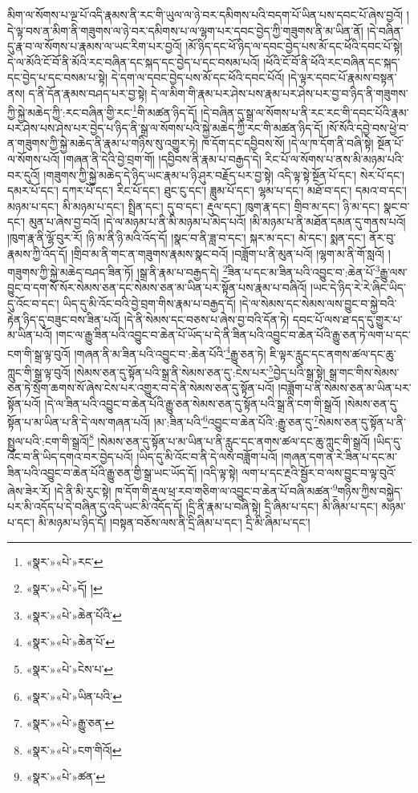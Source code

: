 མིག་ལ་སོགས་པ་ལྔ་པོ་འདི་རྣམས་ནི་རང་གི་ཡུལ་ལ་ཉེ་བར་དམིགས་པའི་བདག་པོ་ཡིན་པས་དབང་པོ་ཞེས་བྱའོ། །དེ་ལྟ་བས་ན་མིག་ནི་གཟུགས་ལ་ཉེ་བར་དམིགས་པ་ལ་ལྷག་པར་དབང་བྱེད་ཀྱི་གཟུགས་ནི་མ་ཡིན་ནོ། །དེ་བཞིན་དུ་རྣ་བ་ལ་སོགས་པ་རྣམས་ལ་ཡང་རིག་པར་བྱའོ། །མོ་ཉིད་དང་ཕོ་ཉིད་ལ་དབང་བྱེད་པས་མོ་དང་ཕོའི་དབང་པོ་སྟེ། དེ་ལ་མོའི་ངོ་བོ་ནི་མོའི་རང་བཞིན་དང་སྐད་དང་བྱེད་པ་དང་བསམ་པའོ། །ཕོའི་ངོ་བོ་ནི་ཕོའི་རང་བཞིན་དང་སྐད་དང་བྱེད་པ་དང་བསམ་པ་སྟེ། དེ་དག་ལ་དབང་བྱེད་པས་མོ་དང་ཕོའི་དབང་པོའོ། །དེ་ལྟར་དབང་པོ་རྣམས་བསྟན་ནས། ད་ནི་དོན་རྣམས་བཤད་པར་བྱ་སྟེ། དེ་ལ་མིག་གི་རྣམ་པར་ཤེས་པས་རྣམ་པར་ཤེས་པར་བྱ་བ་ཉིད་ནི་གཟུགས་ཀྱི་སྐྱེ་མཆེད་ཀྱི་:རང་བཞིན་གྱི་རང་\footnote{«སྣར་»«པེ་»རང་}གི་མཚན་ཉིད་དོ། །དེ་བཞིན་དུ་སྒྲ་ལ་སོགས་པ་ནི་རང་རང་གི་དབང་པོའི་རྣམ་པར་ཤེས་པས་ཤེས་པར་བྱེད་པ་ཉིད་ནི་སྒྲ་ལ་སོགས་པའི་སྐྱེ་མཆེད་ཀྱི་རང་གི་མཚན་ཉིད་དོ། །སོ་སོའི་དབྱེ་བས་ཕྱེ་བ་ན་གཟུགས་ཀྱི་སྐྱེ་མཆེད་ནི་རྣམ་པ་གཉིས་སུ་འགྱུར་ཏེ། ཁ་དོག་དང་དབྱིབས་སོ། །དེ་ལ་ཁ་དོག་ནི་བཞི་སྟེ། སྔོན་པོ་ལ་སོགས་པའོ། །གཞན་ནི་དེའི་བྱེ་བྲག་གོ། །དབྱིབས་ནི་རྣམ་པ་བརྒྱད་དེ། རིང་པོ་ལ་སོགས་པ་ནས་མི་མཉམ་པའི་བར་དུའོ། །གཟུགས་ཀྱི་སྐྱེ་མཆེད་དེ་ཉིད་ཡང་རྣམ་པ་ཉི་ཤུར་བརྗོད་པར་བྱ་སྟེ། འདི་ལྟ་སྟེ་སྔོན་པོ་དང་། སེར་པོ་དང་། དམར་པོ་དང་། དཀར་པོ་དང་། རིང་པོ་དང་། ཐུང་ངུ་དང་། ཟླུམ་པོ་དང་། ལྷམ་པ་དང་། མཐོ་བ་དང་། དམའ་བ་དང་། མཉམ་པ་དང་། མི་མཉམ་པ་དང་། སྤྲིན་དང་། དུ་བ་དང་། རྡུལ་དང་། ཁུག་རྣ་དང་། གྲིབ་མ་དང་། ཉི་མ་དང་། སྣང་བ་དང་། མུན་པ་ཞེས་བྱ་བའོ། །དེ་ལ་མཉམ་པ་ནི་མི་མཉམ་པ་མེད་པའོ། །མི་མཉམ་པ་ནི་མཐོན་དམན་དུ་གནས་པའོ། །ཁུག་རྣ་ནི་ལྷོ་བུར་རོ། །ཉི་མ་ནི་ཉི་མའི་འོད་དོ། །སྣང་བ་ནི་ཟླ་བ་དང་། སྐར་མ་དང་། མེ་དང་། སྨན་དང་། ནོར་བུ་རྣམས་ཀྱི་འོད་དོ། །གྲིབ་མ་ནི་གང་ན་གཟུགས་རྣམས་སྣང་བའོ། །བཟློག་པ་ནི་མུན་པའོ། །ལྷག་མ་ནི་གོ་སླའོ། །གཟུགས་ཀྱི་སྐྱེ་མཆེད་བཤད་ཟིན་ཏོ། །སྒྲ་ནི་རྣམ་པ་བརྒྱད་དེ། \footnote{«སྣར་»«པེ་»དོ། ། }ཟིན་པ་དང་མ་ཟིན་པའི་འབྱུང་བ་:ཆེན་པོ་\footnote{«སྣར་»«པེ་»ཆེན་པོའི་}རྒྱུ་ལས་བྱུང་བ་དག་སོ་སོར་སེམས་ཅན་དང་སེམས་ཅན་མ་ཡིན་པར་སྟོན་པས་རྣམ་པ་བཞིའོ། །ཡང་དེ་ཉིད་རེ་རེ་ཞིང་ཡིད་དུ་འོང་བ་དང་། ཡིད་དུ་མི་འོང་བའི་བྱེ་བྲག་གིས་རྣམ་པ་བརྒྱད་དོ། །དེ་ལ་སེམས་དང་སེམས་ལས་བྱུང་བ་སྐྱེ་བའི་རྟེན་ཉིད་དུ་བཟུང་བས་ཟིན་པའོ། །དེ་ནི་སེམས་དང་བཅས་པ་ཞེས་བྱ་བའི་དོན་ཏེ། དབང་པོ་ལས་ཐ་དད་དུ་གྱུར་པ་མ་ཡིན་པའོ། །གང་ལ་རྒྱུ་ཟིན་པའི་འབྱུང་བ་ཆེན་པོ་ཡོད་པ་དེ་ནི་ཟིན་པའི་འབྱུང་བ་ཆེན་པོའི་རྒྱུ་ཅན་ཏེ་ལག་པ་དང་ངག་གི་སྒྲ་ལྟ་བུའོ། །གཞན་ནི་མ་ཟིན་པའི་འབྱུང་བ་:ཆེན་པོའི་\footnote{«སྣར་»«པེ་»ཆེན་པོ་}རྒྱུ་ཅན་ཏེ། ཇི་ལྟར་རླུང་དང་ནགས་ཚལ་དང་ཆུ་ཀླུང་གི་སྒྲ་ལྟ་བུའོ། །སེམས་ཅན་དུ་སྟོན་པའི་སྒྲ་ནི་སེམས་ཅན་དུ་:ངེས་པར་\footnote{«སྣར་»«པེ་»ངེས་པ་}བྱེད་པའི་སྒྲ་སྟེ། སྒྲ་གང་གིས་སེམས་ཅན་ཏེ་སྲོག་ཆགས་སོ་ཞེས་ངེས་པར་འགྱུར་བ་དེ་ནི་སེམས་ཅན་དུ་སྟོན་པའོ། །བཟློག་པ་ནི་སེམས་ཅན་མ་ཡིན་པར་སྟོན་པའོ། །དེ་ལ་ཟིན་པའི་འབྱུང་བ་ཆེན་པོའི་རྒྱུ་ཅན་སེམས་ཅན་དུ་སྟོན་པའི་སྒྲ་ནི་ངག་གི་སྒྲའོ། །སེམས་ཅན་དུ་སྟོན་པ་མ་ཡིན་པ་ནི་དེ་ལས་གཞན་པའོ། །མ་:ཟིན་པའི་\footnote{«སྣར་»«པེ་»ཡིན་པའི་}འབྱུང་བ་ཆེན་པོའི་:རྒྱུ་ཅན་དུ་\footnote{«སྣར་»«པེ་»རྒྱུ་ཅན་}སེམས་ཅན་དུ་སྟོན་པ་ནི་སྤྲུལ་པའི་:ངག་གི་སྒྲའོ།\footnote{«སྣར་»«པེ་»ངག་གིའོ།} །སེམས་ཅན་དུ་སྟོན་པ་མ་ཡིན་པ་ནི་རླུང་དང་ནགས་ཚལ་དང་ཆུ་ཀླུང་གི་སྒྲའོ། །ཡིད་དུ་འོང་བ་ནི་ཡིད་དགའ་བར་བྱེད་པའོ། །ཡིད་དུ་མི་འོང་བ་ནི་དེ་ལས་བཟློག་པའོ། །གཞན་དག་ན་རེ་ཟིན་པ་དང་མ་ཟིན་པའི་འབྱུང་བ་ཆེན་པོའི་རྒྱུ་ཅན་གྱི་སྒྲ་ཡང་ཡོད་དོ། །འདི་ལྟ་སྟེ། ལག་པ་དང་རྔའི་སྦྱོར་བ་ལས་བྱུང་བ་ལྟ་བུའོ་ཞེས་ཟེར་རོ། །དེ་ནི་མི་རུང་སྟེ། ཁ་དོག་གི་རྡུལ་ཕྲ་རབ་གཅིག་ལ་འབྱུང་བ་ཆེན་པོ་བཞི་མཚན་\footnote{«སྣར་»«པེ་»ཚན་}གཉིས་ཀྱིས་བསྐྱེད་པར་མི་འདོད་པ་དེ་བཞིན་དུ་འདི་ཡང་མི་འདོད་དོ། །དྲི་ནི་རྣམ་པ་བཞི་སྟེ། དྲི་ཞིམ་པ་དང་། མི་ཞིམ་པ་དང་། མཉམ་པ་དང་། མི་མཉམ་པ་ཉིད་དོ། །བསྟན་བཅོས་ལས་ནི་དྲི་ཞིམ་པ་དང་། དྲི་མི་ཞིམ་པ་དང་། 